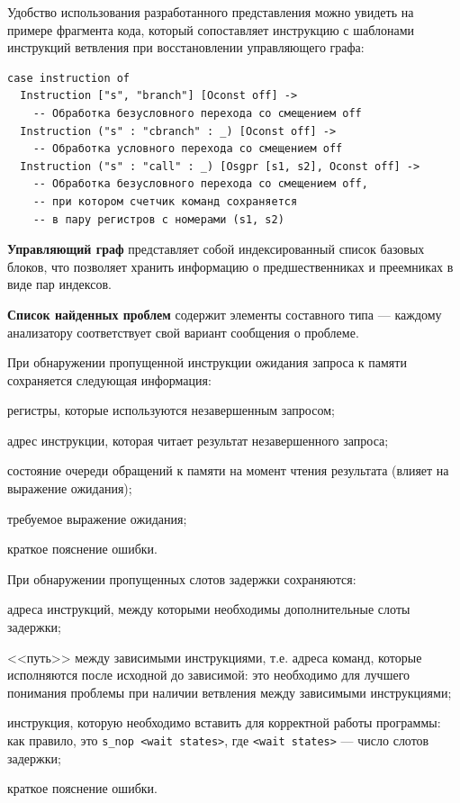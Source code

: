 \documentclass[a4paper,14pt]{extarticle}
\begin{document}
{\begin{ol}
Удобство использования разработанного представления можно увидеть на примере фрагмента кода,
который сопоставляет инструкцию с шаблонами инструкций ветвления
при восстановлении управляющего графа:
\begin{verbatim}
case instruction of
  Instruction ["s", "branch"] [Oconst off] ->
    -- Обработка безусловного перехода со смещением off
  Instruction ("s" : "cbranch" : _) [Oconst off] ->
    -- Обработка условного перехода со смещением off
  Instruction ("s" : "call" : _) [Osgpr [s1, s2], Oconst off] ->
    -- Обработка безусловного перехода со смещением off,
    -- при котором счетчик команд сохраняется
    -- в пару регистров с номерами (s1, s2)
\end{verbatim}

\item \textbf{Управляющий граф} представляет собой индексированный список базовых блоков,
  что позволяет хранить информацию о предшественниках и преемниках в виде пар индексов.

\item \textbf{Список найденных проблем} содержит элементы составного типа — каждому анализатору
соответствует свой вариант сообщения о проблеме.

При обнаружении пропущенной инструкции ожидания запроса к памяти сохраняется следующая информация:
\begin{ul}
\item регистры, которые используются незавершенным запросом;
\item адрес инструкции, которая читает результат незавершенного запроса;
\item состояние очереди обращений к памяти на момент чтения результата (влияет на выражение ожидания);
\item требуемое выражение ожидания;
\item краткое пояснение ошибки.
\end{ul}

При обнаружении пропущенных слотов задержки сохраняются:
\begin{ul}
\item адреса инструкций, между которыми необходимы дополнительные слоты задержки;
\item <<путь>> между зависимыми инструкциями, т.е. адреса команд, которые исполняются после исходной до зависимой:
это необходимо для лучшего понимания проблемы при наличии ветвления между зависимыми инструкциями;
\item инструкция, которую необходимо вставить для корректной работы программы:
как правило, это \verb|s_nop <wait states>|, где \verb|<wait states>| — число слотов задержки;
\item краткое пояснение ошибки.
\end{ul}


\end{ol}}
\end{document}
